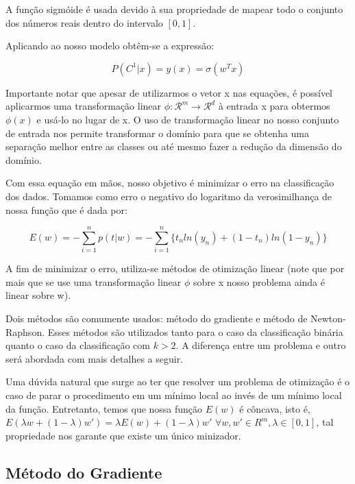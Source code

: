 A função sigmóide é usada devido à sua propriedade de mapear
todo o conjunto dos números reais dentro do intervalo $[0, 1]$.

Aplicando ao nosso modelo obtêm-se a expressão:

\begin{center}
	\begin{equation}
		P(C^1 | x) = y(x) = \sigma(w^Tx)
	\end{equation}
\end{center}

Importante notar que apesar de utilizarmos o vetor x nas equações, é possível aplicarmos uma
transformação linear $\phi : \mathcal{R}^m \rightarrow \mathcal{R}^d$ à entrada x para obtermos
$\phi(x)$ e usá-lo no lugar de x. O uso de transformação linear no nosso conjunto
de entrada nos permite transformar o domínio para que se obtenha uma separação
melhor entre as classes ou até mesmo fazer a redução da dimensão do domínio.

Com essa equação em mãos, nosso objetivo é minimizar o erro na classificação dos dados. Tomamos
como erro o negativo do logaritmo da verosimilhança de nossa função que é dada por:

\begin{center}
	\begin{equation}
		E(w) = - \sum_{i = 1}^{n} p(t | w) = 
		- \sum_{i = 1}^{n} \{ t_nln(y_n) + (1 - t_n) ln(1 - y_n) \}
	\end{equation}
\end{center}

A fim de minimizar o erro, utiliza-se métodos de otimização linear (note que por mais que se use uma
transformação linear $\phi$ sobre x nosso problema ainda é linear sobre w).

Dois métodos são comumente	usados: método do gradiente e método de Newton-Raphson.
Esses métodos são utilizados tanto para o caso da classificação binária
quanto o caso da classificação com $k > 2$. A diferença entre um problema e outro será abordada
com mais detalhes a seguir.

Uma dúvida natural que surge ao ter que resolver um problema de otimização é o caso de parar o
procedimento em um mínimo local ao invés de um mínimo local da função.	Entretanto, temos que nossa
função $E(w)$ é côncava, isto é, $E(\lambda w + (1 - \lambda ) w') = \lambda E(w) 
	+ (1 - \lambda ) w'$
 $\forall w, w' \in R^m, \lambda \in [0, 1]$, tal propriedade nos garante que existe um único minizador.
 

\subsection{Método do Gradiente}\label{subsec:grad_descent}

